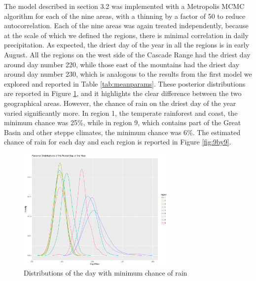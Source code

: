 \documentclass{article}
\begin{document}
The model described in section 3.2 was implemented with a Metropolis MCMC algorithm for each of the nine areas, with a thinning by a factor of 50 to reduce autocorrelation. Each of the nine areas was again treated independently, because at the scale of which we defined the regions, there is minimal correlation in daily precipitation.  As expected, the driest day of the year in all the regions is in early August. All the regions on the west side of the Cascade Range had the driest day around day number 220, while those east of the mountains had the driest day around day number 230, which is analogous to the results from the first model we explored and reported in Table \ref{tab:meanparams}. These posterior distributions are reported in Figure \ref{fig:driestDist}, and it highlights the clear difference between the two geographical areas. However, the chance of rain on the driest day of the year varied significantly more. In region 1, the temperate rainforest and coast, the minimum chance was 25\%, while in region 9, which contains part of the Great Basin and other steppe climates, the minimum chance was 6\%. The estimated chance of rain for each day and each region is reported in Figure \ref{fig:9by9}.

\begin{figure}
\centering
\includegraphics[width = .4\textwidth, height = 6cm]{NicestDayOfYear}
\caption{Distributions of the day with minimum chance of rain}
\label{fig:driestDist}
\end{figure}
\end{document}
